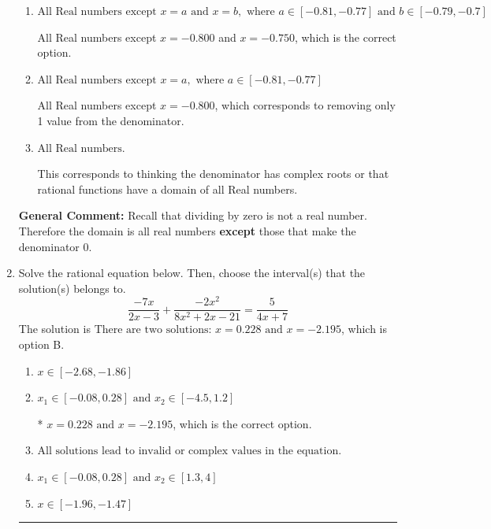 \documentclass{extbook}[14pt]
\newcommand{\litem}[1]{\item #1

\rule{\textwidth}{0.4pt}}
\begin{document}
\begin{enumerate}
{\begin{enumerate}[label=\Alph*.]
All Real numbers except $x = -20.000$, which corresponds to removing a distractor value from the denominator.
\item \( \text{All Real numbers except } x = a \text{ and } x = b, \text{ where } a \in [-0.81, -0.77] \text{ and } b \in [-0.79, -0.7] \)

All Real numbers except $x = -0.800$ and $x = -0.750$, which is the correct option.
\item \( \text{All Real numbers except } x = a, \text{ where } a \in [-0.81, -0.77] \)

All Real numbers except $x = -0.800$, which corresponds to removing only 1 value from the denominator.
\item \( \text{All Real numbers.} \)

This corresponds to thinking the denominator has complex roots or that rational functions have a domain of all Real numbers.
\end{enumerate}

\textbf{General Comment:} Recall that dividing by zero is not a real number. Therefore the domain is all real numbers \textbf{except} those that make the denominator 0.
}
\litem{
Solve the rational equation below. Then, choose the interval(s) that the solution(s) belongs to.
\[ \frac{-7x}{2x -3} + \frac{-2x^{2}}{8x^{2} +2 x -21} = \frac{5}{4x + 7} \]The solution is \( \text{There are two solutions: } x = 0.228 \text{ and } x = -2.195 \), which is option B.\begin{enumerate}[label=\Alph*.]
\item \( x \in [-2.68,-1.86] \)


\item \( x_1 \in [-0.08, 0.28] \text{ and } x_2 \in [-4.5,1.2] \)

* $x = 0.228 \text{ and } x = -2.195$, which is the correct option.
\item \( \text{All solutions lead to invalid or complex values in the equation.} \)


\item \( x_1 \in [-0.08, 0.28] \text{ and } x_2 \in [1.3,4] \)


\item \( x \in [-1.96,-1.47] \)


\end{enumerate}

}
\end{enumerate}
\end{document}
